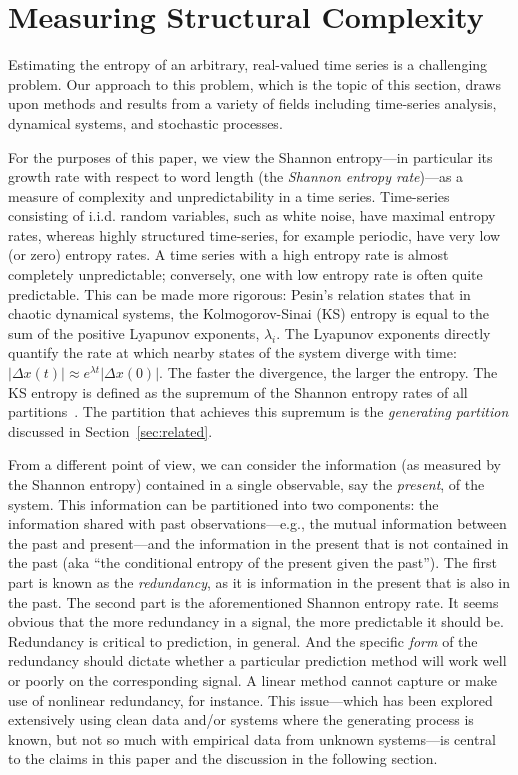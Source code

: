 \section{Measuring Structural Complexity }\label{sec:meaComplex}


Estimating the entropy of an arbitrary, real-valued time series is a
challenging problem.  Our approach to this problem, which is the topic
of this section, draws upon methods and results from a variety of
fields including time-series analysis, dynamical systems, and
stochastic processes.

For the purposes of this paper, we view the Shannon entropy---in
particular its growth rate with respect to word length (the
\emph{Shannon entropy rate})---as a measure of complexity and
unpredictability in a time series.  Time-series consisting of i.i.d.
random variables, such as white noise, have maximal entropy rates,
whereas highly structured time-series, for example periodic, have very
low (or zero) entropy rates. A time series with a high entropy rate is
almost completely unpredictable; conversely, one with low entropy rate
is often quite predictable. This can be made more rigorous: Pesin's
relation \cite{pesin77} states that in chaotic dynamical systems, the
Kolmogorov-Sinai (KS) entropy is equal to the sum of the positive
Lyapunov exponents, $\lambda_i$.  The Lyapunov exponents directly
quantify the rate at which nearby states of the system diverge with
time: $\left| \Delta x(t) \right| \approx e^{\lambda t} \left| \Delta
x(0) \right|$.  The faster the divergence, the larger the entropy.
The KS entropy is defined as the supremum of the Shannon entropy rates
of all partitions~\cite{petersen1989}. The partition that achieves
this supremum is the \emph{generating partition} discussed in
Section~\ref{sec:related}.

From a different point of view, we can consider the information (as
measured by the Shannon entropy) contained in a single observable, say
the \emph{present}, of the system. This information can be partitioned
into two components: the information shared with past
observations---e.g., the mutual information between the past and
present---and the information in the present that is not contained in
the past (aka ``the conditional entropy of the present given the
past'').  The first part is known as the \emph{redundancy}, as it is
information in the present that is also in the past.  The second part
is the aforementioned Shannon entropy rate.  It seems obvious that the
more redundancy in a signal, the more predictable it should be.
Redundancy is critical to prediction, in general.  And the specific
\emph{form} of the redundancy should dictate whether a particular
prediction method will work well or poorly on the corresponding
signal.  A linear method cannot capture or make use of nonlinear
redundancy, for instance.  This issue---which has been explored
extensively using clean data and/or systems where the generating
process is known, but not so much with empirical data from unknown
systems---is central to the claims in this paper and the discussion in
the following section.

